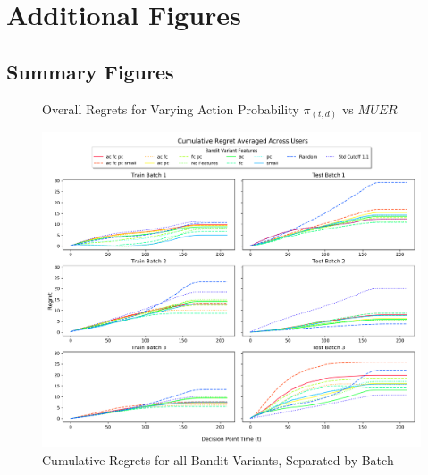 \chapter{Additional Figures}
\label{AppendixA}

\section{Summary Figures}

\begin{figure}[h!]
\caption{Overall Regrets for Varying Action Probability $\pi_{(t,d)}$ vs $MUER$}
\label{RandomActionVsProbability}
\end{figure}


\begin{figure}[H]
\includegraphics[width=1.35\textwidth,center]{figures/cum_regret_comparison.png}%
\caption{Cumulative Regrets for all Bandit Variants, Separated by Batch}
\label{Cumulative Regrets for all Bandit Variants, Separated by Batch}
\end{figure}


